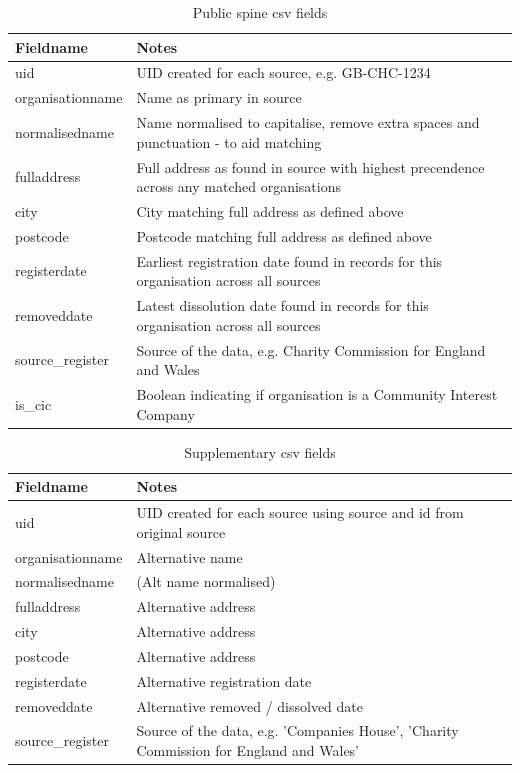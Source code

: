 \documentclass{article}
\begin{document}
\begin{table}[h]
  \centering
  \begin{tabularx}{\textwidth}{|l|X|}
    \hline
    Fieldname  &	Notes \\
    \hline \hline
    uid &	UID created for each source, e.g. GB-CHC-1234\\    \hline
    organisationname &	Name as primary in source\\    \hline
    normalisedname &	Name normalised to capitalise, remove extra spaces and punctuation - to aid matching \\    \hline
    fulladdress &	Full address as found in source with highest precendence across any matched organisations\\    \hline
    city &	City matching full address as defined above\\    \hline
    postcode &	Postcode matching full address as defined above\\    \hline
    registerdate &	Earliest registration date found in records for this organisation across all sources\\    \hline
    removeddate &	Latest dissolution date found in records for this organisation across all sources\\    \hline
    source\_register & Source of the data, e.g. Charity Commission for England and Wales \\    \hline
    is\_cic & Boolean indicating if organisation is a Community Interest Company\\    \hline
\end{tabularx}
\caption{Public spine csv fields}
\label{tab:spine_fields}
\end{table}

\begin{table}[h]
  \centering
  \begin{tabularx}{\textwidth}{|l|X|}
    \hline
Fieldname &	Notes \\ \hline \hline
uid &	UID created for each source using source and id from original source \\ \hline
organisationname &	Alternative name \\ \hline
normalisedname &	(Alt name normalised) \\ \hline
fulladdress &	Alternative address \\ 
city &	 Alternative address\\ 
postcode &	Alternative address\\ \hline
registerdate &	 Alternative registration date \\ \hline
removeddate & Alternative removed / dissolved date \\ \hline
source\_register & Source of the data, e.g. 'Companies House', 'Charity Commission for England and Wales' \\    \hline
\end{tabularx}
\caption{Supplementary csv fields}
\label{tab:supplementary_fields}
\end{table}
\end{document}

